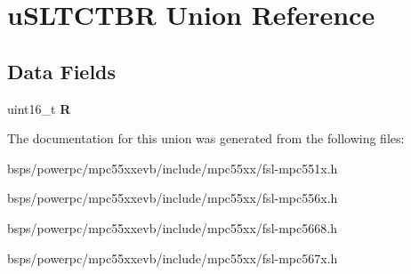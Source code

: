 \hypertarget{unionuSLTCTBR}{}\section{u\+S\+L\+T\+C\+T\+BR Union Reference}
\label{unionuSLTCTBR}
\subsection*{Data Fields}
\begin{DoxyCompactItemize}
\item 
\mbox{\label{unionuSLTCTBR_abf3b2472cba0f76fe531ff370b8ce6c3}} 
uint16\+\_\+t {\bfseries R}
\end{DoxyCompactItemize}


The documentation for this union was generated from the following files\+:\begin{DoxyCompactItemize}
\item 
bsps/powerpc/mpc55xxevb/include/mpc55xx/fsl-\/mpc551x.\+h\item 
bsps/powerpc/mpc55xxevb/include/mpc55xx/fsl-\/mpc556x.\+h\item 
bsps/powerpc/mpc55xxevb/include/mpc55xx/fsl-\/mpc5668.\+h\item 
bsps/powerpc/mpc55xxevb/include/mpc55xx/fsl-\/mpc567x.\+h\end{DoxyCompactItemize}
